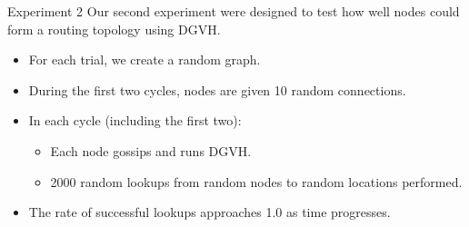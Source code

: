 \documentclass[8pt]{beamer}
\begin{document}
\begin{frame}{Experiment 2}
Our second experiment were designed to test how well nodes could form a routing topology using DGVH.

\begin{itemize}
	\item For each trial, we create a random graph.
	\item During the first two cycles, nodes are given 10 random connections.
	\item In each cycle (including the first two):
	\begin{itemize}
		\item Each node gossips and runs DGVH.
		\item 2000 random lookups from random nodes to random locations performed.
	\end{itemize}
	\item The rate of successful lookups approaches 1.0 as time progresses.
\end{itemize}
\end{frame}
\end{document}
